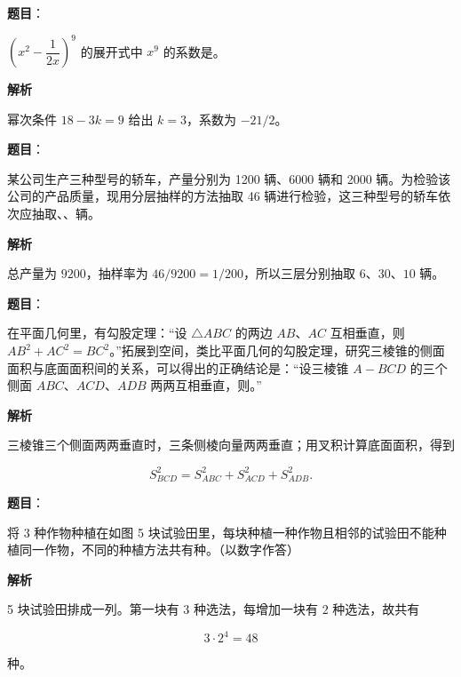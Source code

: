 \begin{answer}

\textbf{题目}：

$\left(x^2-\dfrac1{2x}\right)^9$ 的展开式中 $x^9$ 的系数是\gkblank{}。

\textbf{解析}

幂次条件 $18-3k=9$ 给出 $k=3$，系数为 $-21/2$。


\end{answer}
\begin{answer}

\textbf{题目}：

某公司生产三种型号的轿车，产量分别为 1200 辆、6000 辆和 2000 辆。为检验该公司的产品质量，现用分层抽样的方法抽取 46 辆进行检验，这三种型号的轿车依次应抽取\gkblank{}、\gkblank{}、\gkblank{}辆。

\textbf{解析}

总产量为 $9200$，抽样率为 $46/9200=1/200$，所以三层分别抽取 $6\text{、}30\text{、}10$ 辆。


\end{answer}
\begin{answer}

\textbf{题目}：

在平面几何里，有勾股定理：“设 $\triangle ABC$ 的两边 $AB\text{、}AC$ 互相垂直，则 $AB^2+AC^2=BC^2$。”拓展到空间，类比平面几何的勾股定理，研究三棱锥的侧面面积与底面面积间的关系，可以得出的正确结论是：“设三棱锥 $A-BCD$ 的三个侧面 $ABC\text{、}ACD\text{、}ADB$ 两两互相垂直，则\gkblank{}。”

\textbf{解析}

三棱锥三个侧面两两垂直时，三条侧棱向量两两垂直；用叉积计算底面面积，得到

\nopagebreak[4]
\[
S_{BCD}^2=S_{ABC}^2+S_{ACD}^2+S_{ADB}^2.
\]


\end{answer}
\begin{answer}

\textbf{题目}：

将 3 种作物种植在如图 5 块试验田里，每块种植一种作物且相邻的试验田不能种植同一作物，不同的种植方法共有\gkblank{}种。（以数字作答）
\nopagebreak[4]
\begin{center}\end{center}
\nopagebreak[4]
\textbf{解析}

5 块试验田排成一列。第一块有 $3$ 种选法，每增加一块有 $2$ 种选法，故共有

\nopagebreak[4]
\[
3\cdot2^4=48
\]

种。


\end{answer}

